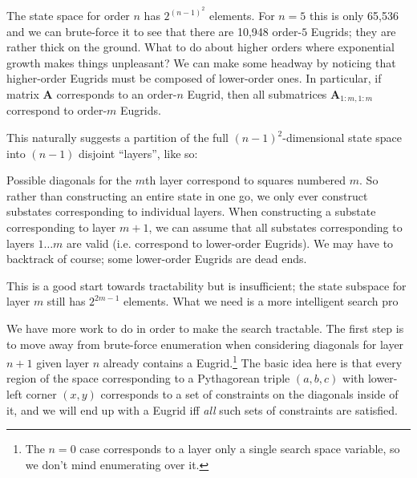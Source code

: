 \documentclass[letterpaper]{article}
\begin{document}
The state space for order $n$ has $2^{(n-1)^2}$ elements. For $n=5$ this is only 65,536 and
we can brute-force it to see that there are 10,948 order-$5$ Eugrids; they are rather thick
on the ground. What to do about higher orders where exponential growth makes things
unpleasant? We can make some headway by noticing that higher-order Eugrids must be composed
of lower-order ones. In particular, if matrix $\mathbf{A}$ corresponds to an order-$n$
Eugrid, then all submatrices $\mathbf{A}_{1:m,1:m}$ correspond to order-$m$ Eugrids.

This naturally suggests a partition of the full $(n-1)^2$-dimensional state space into
$(n-1)$ disjoint ``layers'', like so:

\begin{center}
  
\end{center}

Possible diagonals for the $m$th layer correspond to squares numbered $m$. So rather than
constructing an entire state in one go, we only ever construct substates corresponding to
individual layers. When constructing a substate corresponding to layer $m+1$, we can assume
that all substates corresponding to layers $1 \ldots m$ are valid (i.e. correspond to
lower-order Eugrids). We may have to backtrack of course; some lower-order Eugrids are dead
ends.

This is a good start towards tractability but is insufficient; the state subspace for layer
$m$ still has $2^{2m-1}$ elements. What we need is a more intelligent search pro

We have more work to do in order to make the search tractable. The first step is to move away
from brute-force enumeration when considering diagonals for layer $n+1$ given layer $n$
already contains a Eugrid.\footnote{The $n=0$ case corresponds to a layer only a single
search space variable, so we don't mind enumerating over it.} The basic idea here is that
every region of the space corresponding to a Pythagorean triple $(a, b, c)$ with lower-left
corner $(x, y)$ corresponds to a set of constraints on the diagonals inside of it, and we
will end up with a Eugrid iff \emph{all} such sets of constraints are satisfied.
\end{document}
